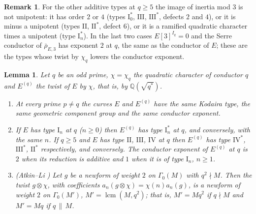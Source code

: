 \documentclass[11pt]{amsart}
\newtheorem{lemma}[theorem]{Lemma}
\theoremstyle{definition}
\newtheorem{remark}[theorem]{Remark}
\newcommand{\Q}{\mathbb{Q}}
\begin{document}
\begin{remark}\label{rem:types}
For the other additive types at $q\ge5$ the image of inertia mod $3$ is not unipotent: it has order $2$ or $4$ (types $\mathrm{I}_0^*$, $\mathrm{III}$, $\mathrm{III}^*$, defects $2$ and $4$), or it is minus a unipotent (types $\mathrm{II}$, $\mathrm{II}^*$, defect $6$), or it is a ramified quadratic character times a unipotent (type $\mathrm{I}_n^*$). In the last two cases $E[3]^{I_q}=0$ and the Serre conductor of $\bar\rho_{E,3}$ has exponent $2$ at $q$, the same as the conductor of $E$; these are the types whose twist by $\chi_q$ lowers the conductor exponent.
\end{remark}

\begin{lemma}\label{lem:twist}
Let $q$ be an odd prime, $\chi=\chi_q$ the quadratic character of conductor $q$ and $E^{(q)}$ the twist of $E$ by $\chi$, that is, by $\Q(\sqrt{q^*})$.
\begin{enumerate}
\item[(i)] At every prime $p\ne q$ the curves $E$ and $E^{(q)}$ have the same Kodaira type, the same geometric component group and the same conductor exponent.
\item[(ii)] If $E$ has type $\mathrm{I}_n$ at $q$ ($n\ge0$) then $E^{(q)}$ has type $\mathrm{I}_n^*$ at $q$, and conversely, with the same $n$. If $q\ge5$ and $E$ has type $\mathrm{II}$, $\mathrm{III}$, $\mathrm{IV}$ at $q$ then $E^{(q)}$ has type $\mathrm{IV}^*$, $\mathrm{III}^*$, $\mathrm{II}^*$ respectively, and conversely. The conductor exponent of $E^{(q)}$ at $q$ is $2$ when its reduction is additive and $1$ when it is of type $\mathrm{I}_n$, $n\ge1$.
\item[(iii)] (Atkin--Li \cite{AtkinLi78}) Let $g$ be a newform of weight $2$ on $\Gamma_0(M)$ with $q^2\nmid M$. Then the twist $g\otimes\chi$, with coefficients $a_n(g\otimes\chi)=\chi(n)a_n(g)$, is a newform of weight $2$ on $\Gamma_0(M')$, $M'=\operatorname{lcm}(M,q^2)$; that is, $M'=Mq^2$ if $q\nmid M$ and $M'=Mq$ if $q\,\|\,M$.
\end{enumerate}
\end{lemma}
\end{document}
